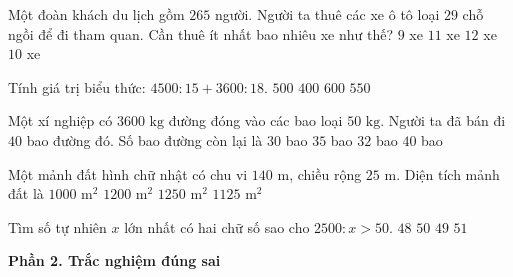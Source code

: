 \begin{ex} %
Một đoàn khách du lịch gồm $265$ người. Người ta thuê các xe ô tô loại $29$ chỗ ngồi để đi tham quan. Cần thuê ít nhất bao nhiêu xe như thế?
\choice
{$9$ xe}
{$11$ xe}
{$12$ xe}
{\True $10$ xe}
\end{ex}

\begin{ex} %
Tính giá trị biểu thức: $4500 : 15 + 3600 : 18$.
\choice
{\True $500$}
{$400$}
{$600$}
{$550$}
\end{ex}

\begin{ex} %
Một xí nghiệp có $3600\text{ kg}$ đường đóng vào các bao loại $50\text{ kg}$. Người ta đã bán đi $40$ bao đường đó. Số bao đường còn lại là
\choice
{$30$ bao}
{$35$ bao}
{\True $32$ bao}
{$40$ bao}
\end{ex}

\begin{ex} %
Một mảnh đất hình chữ nhật có chu vi $140\text{ m}$, chiều rộng $25\text{ m}$. Diện tích mảnh đất là
\choice
{$1000\text{ m}^2$}
{$1200\text{ m}^2$}
{$1250\text{ m}^2$}
{\True $1125\text{ m}^2$}
\end{ex}

\begin{ex} %
Tìm số tự nhiên $x$ lớn nhất có hai chữ số sao cho $2500 : x > 50$.
\choice
{$48$}
{$50$}
{\True $49$}
{$51$}
\end{ex}

\textbf{Phần 2. Trắc nghiệm đúng sai}

